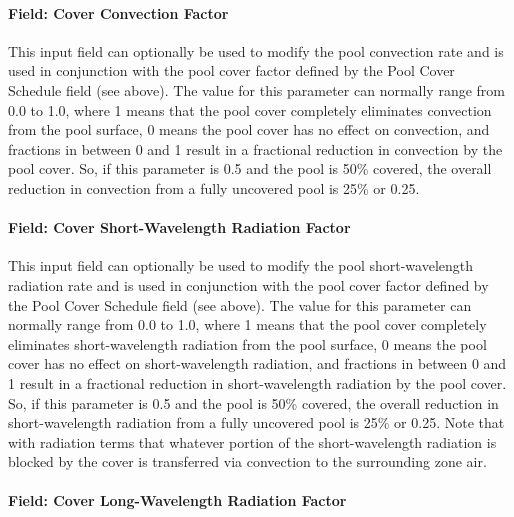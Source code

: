 \paragraph{Field: Cover Convection Factor}\label{field-cover-convection-factor}

This input field can optionally be used to modify the pool convection rate and is used in conjunction with the pool cover factor defined by the Pool Cover Schedule field (see above). The value for this parameter can normally range from 0.0 to 1.0, where 1 means that the pool cover completely eliminates convection from the pool surface, 0 means the pool cover has no effect on convection, and fractions in between 0 and 1 result in a fractional reduction in convection by the pool cover. So, if this parameter is 0.5 and the pool is 50\% covered, the overall reduction in convection from a fully uncovered pool is 25\% or 0.25.

\paragraph{Field: Cover Short-Wavelength Radiation Factor}\label{field-cover-short-wavelength-radiation-factor}

This input field can optionally be used to modify the pool short-wavelength radiation rate and is used in conjunction with the pool cover factor defined by the Pool Cover Schedule field (see above). The value for this parameter can normally range from 0.0 to 1.0, where 1 means that the pool cover completely eliminates short-wavelength radiation from the pool surface, 0 means the pool cover has no effect on short-wavelength radiation, and fractions in between 0 and 1 result in a fractional reduction in short-wavelength radiation by the pool cover. So, if this parameter is 0.5 and the pool is 50\% covered, the overall reduction in short-wavelength radiation from a fully uncovered pool is 25\% or 0.25. Note that with radiation terms that whatever portion of the short-wavelength radiation is blocked by the cover is transferred via convection to the surrounding zone air.

\paragraph{Field: Cover Long-Wavelength Radiation Factor}\label{field-cover-long-wavelength-radiation-factor}

